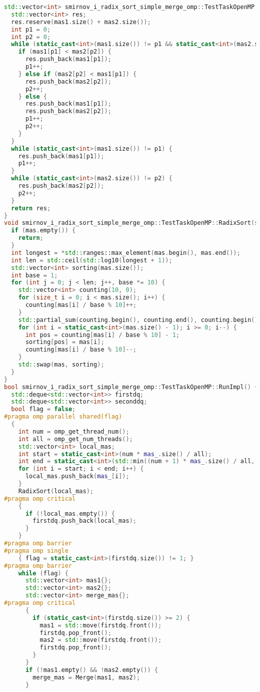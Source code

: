 \documentclass[a4paper,12pt]{article}
\begin{document}
\begin{lstlisting}[language=C++,caption={Фрагмент OpenMP-версии}]
std::vector<int> smirnov_i_radix_sort_simple_merge_omp::TestTaskOpenMP::Merge(std::vector<int> mas1, std::vector<int> mas2) {
  std::vector<int> res;
  res.reserve(mas1.size() + mas2.size());
  int p1 = 0;
  int p2 = 0;
  while (static_cast<int>(mas1.size()) != p1 && static_cast<int>(mas2.size()) != p2) {
    if (mas1[p1] < mas2[p2]) {
      res.push_back(mas1[p1]);
      p1++;
    } else if (mas2[p2] < mas1[p1]) {
      res.push_back(mas2[p2]);
      p2++;
    } else {
      res.push_back(mas1[p1]);
      res.push_back(mas2[p2]);
      p1++;
      p2++;
    }
  }
  while (static_cast<int>(mas1.size()) != p1) {
    res.push_back(mas1[p1]);
    p1++;
  }
  while (static_cast<int>(mas2.size()) != p2) {
    res.push_back(mas2[p2]);
    p2++;
  }
  return res;
}
void smirnov_i_radix_sort_simple_merge_omp::TestTaskOpenMP::RadixSort(std::vector<int>& mas) {
  if (mas.empty()) {
    return;
  }
  int longest = *std::ranges::max_element(mas.begin(), mas.end());
  int len = std::ceil(std::log10(longest + 1));
  std::vector<int> sorting(mas.size());
  int base = 1;
  for (int j = 0; j < len; j++, base *= 10) {
    std::vector<int> counting(10, 0);
    for (size_t i = 0; i < mas.size(); i++) {
      counting[mas[i] / base % 10]++;
    }
    std::partial_sum(counting.begin(), counting.end(), counting.begin());
    for (int i = static_cast<int>(mas.size() - 1); i >= 0; i--) {
      int pos = counting[mas[i] / base % 10] - 1;
      sorting[pos] = mas[i];
      counting[mas[i] / base % 10]--;
    }
    std::swap(mas, sorting);
  }
}
bool smirnov_i_radix_sort_simple_merge_omp::TestTaskOpenMP::RunImpl() {
  std::deque<std::vector<int>> firstdq;
  std::deque<std::vector<int>> seconddq;
  bool flag = false;
#pragma omp parallel shared(flag)
  {
    int num = omp_get_thread_num();
    int all = omp_get_num_threads();
    std::vector<int> local_mas;
    int start = static_cast<int>(num * mas_.size() / all);
    int end = static_cast<int>(std::min((num + 1) * mas_.size() / all, mas_.size()));
    for (int i = start; i < end; i++) {
      local_mas.push_back(mas_[i]);
    }
    RadixSort(local_mas);
#pragma omp critical
    {
      if (!local_mas.empty()) {
        firstdq.push_back(local_mas);
      }
    }
#pragma omp barrier
#pragma omp single
    { flag = static_cast<int>(firstdq.size()) != 1; }
#pragma omp barrier
    while (flag) {
      std::vector<int> mas1{};
      std::vector<int> mas2{};
      std::vector<int> merge_mas{};
#pragma omp critical
      {
        if (static_cast<int>(firstdq.size()) >= 2) {
          mas1 = std::move(firstdq.front());
          firstdq.pop_front();
          mas2 = std::move(firstdq.front());
          firstdq.pop_front();
        }
      }
      if (!mas1.empty() && !mas2.empty()) {
        merge_mas = Merge(mas1, mas2);
      }


\end{lstlisting}
\end{document}

